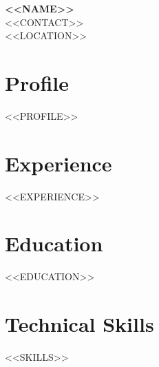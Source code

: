 \documentclass[10pt,a4paper]{extarticle}
\newcommand{\cvheader}{%
  \begin{center}
    {\LARGE\bfseries <<NAME>>}\\[4pt]
    <<CONTACT>>\\[2pt]
    <<LOCATION>>
  \end{center}
}
\begin{document}
\cvheader

\section*{Profile}
<<PROFILE>>

\section*{Experience}
<<EXPERIENCE>>

\section*{Education}
<<EDUCATION>>

\section*{Technical Skills}
<<SKILLS>>
\end{document}

